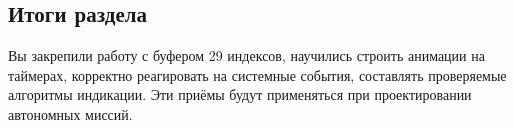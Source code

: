 \subsection*{Итоги раздела}
Вы закрепили работу с буфером 29 индексов, научились строить анимации на таймерах, корректно реагировать на системные события, составлять проверяемые алгоритмы индикации. Эти приёмы будут применяться при проектировании автономных миссий.
